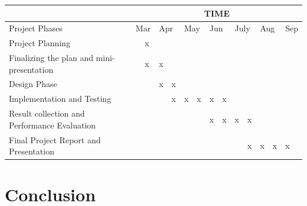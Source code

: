 \documentclass[titlepage]{report}
\begin{document}
\begin{table}[]
\begin{tabular}{|l|l|l|l|l|l|l|l|l|l|l|l|l|l|}
\hline
                                             & \multicolumn{13}{c|}{TIME}                                                                                                                                             \\ \hline
Project Phases                               & \multicolumn{2}{l|}{Mar} & \multicolumn{2}{l|}{Apr} & \multicolumn{2}{l|}{May} & \multicolumn{2}{l|}{Jun} & \multicolumn{2}{l|}{July} & \multicolumn{2}{l|}{Aug} & Sep \\ \hline
Project Planning                             &            & x           &             &            &             &            &             &            &             &             &             &            &     \\ \hline
Finalizing the plan and mini-presentation    &            & x           & x           &            &             &            &             &            &             &             &             &            &     \\ \hline
Design Phase                                 &            &             & x           & x          &             &            &             &            &             &             &             &            &     \\ \hline
Implementation and Testing                   &            &             &             & x          & x           & x          & x           & x          &             &             &             &            &     \\ \hline
Result collection and Performance Evaluation &            &             &             &            &             &            & x           & x          & x           & x           &             &            &     \\ \hline
Final Project Report and Presentation        &            &             &             &            &             &            &             &            &             & x           & x           & x          & x   \\ \hline
\end{tabular}
\end{table}

\chapter{Conclusion}
\end{document}
